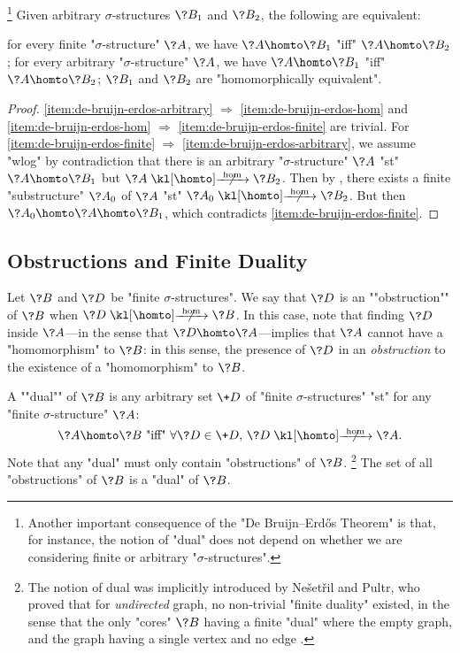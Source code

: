 \begin{corollary}
	\!\footnote{Another important consequence of the "De Bruijn–Erdős Theorem" is that,
	for instance, the notion of "dual" does not depend on whether we are considering finite or
	arbitrary "$\sigma$-structures".}
	\AP\label{coro:de-bruijn-erdos}
	Given arbitrary $\sigma$-structures $\?B_1$ and $\?B_2$, the following are equivalent:
	\begin{enumerate}
		\itemAP\label{item:de-bruijn-erdos-finite} for every finite "$\sigma$-structure" $\?A$, we have $\?A \homto \?B_1$
		"iff" $\?A \homto \?B_2$;
		\itemAP\label{item:de-bruijn-erdos-arbitrary} for every arbitrary "$\sigma$-structure" $\?A$, we have $\?A \homto \?B_1$
			"iff" $\?A \homto \?B_2$;
		\itemAP\label{item:de-bruijn-erdos-hom} $\?B_1$ and $\?B_2$ are "homomorphically equivalent".
	\end{enumerate}
\end{corollary}
\begin{proof}
	\eqref{item:de-bruijn-erdos-arbitrary} $\Rightarrow$ \eqref{item:de-bruijn-erdos-hom}
	and \eqref{item:de-bruijn-erdos-hom} $\Rightarrow$ \eqref{item:de-bruijn-erdos-finite}
	are trivial.
	For \eqref{item:de-bruijn-erdos-finite} $\Rightarrow$ \eqref{item:de-bruijn-erdos-arbitrary},
	we assume "wlog" by contradiction that there is an arbitrary "$\sigma$-structure" $\?A$ "st" $\?A \homto \?B_1$ but $\?A \nothomto \?B_2$. Then by ,
	there exists a finite "substructure" $\?A_0$ of $\?A$ "st" $\?A_0 \nothomto \?B_2$.
	But then $\?A_0 \homto \?A \homto \?B_1$, which contradicts \eqref{item:de-bruijn-erdos-finite}.
\end{proof}


\subsection{Obstructions and Finite Duality}

Let $\?B$ and $\?D$ be "finite $\sigma$-structures".
We say that $\?D$ is an \AP""obstruction"" of $\?B$ when $\?D \nothomto \?B$.
In this case, note that finding $\?D$ inside $\?A$---in the sense that $\?D \homto \?A$---implies that $\?A$ cannot have a "homomorphism" to $\?B$: in this sense, the presence of
$\?D$ in an \emph{obstruction} to the existence of a "homomorphism" to $\?B$.

A \AP""dual"" of $\?B$ is any arbitrary set $\+D$ of "finite $\sigma$-structures" "st"
for any "finite $\sigma$-structure" $\?A$:
\[
	\?A \homto \?B
	\text{ "iff" }
	\forall \?D \in \+D,\, \?D \nothomto \?A.
\]
Note that any "dual" must only contain "obstructions" of $\?B$.%
\footnote{The notion of dual was implicitly introduced
by Ne\v{s}et\v{r}il and Pultr, who proved that for \emph{undirected} graph, no
non-trivial "finite duality" existed, in the sense that the
only "cores" $\?B$ having a finite "dual" where the empty graph, and the graph having
a single vertex and no edge \cite[Corollary 4.1]{NesetrilPultr1978Duality}.}
The set of all "obstructions" of $\?B$ is a "dual" of $\?B$.

